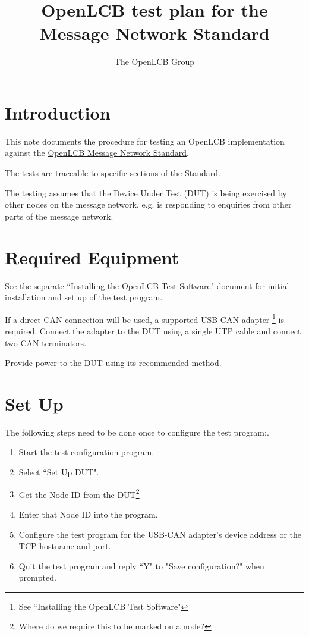 \documentclass[11pt]{article}
\title{OpenLCB test plan for the Message Network Standard}
\author{The OpenLCB Group}
\begin{document}
\maketitle


\section{Introduction}

This note documents the procedure for testing an OpenLCB implementation against the
\href{https://nbviewer.org/github/openlcb/documents/blob/master/standards/MessageNetworkS.pdf}
    {OpenLCB Message Network Standard}.

The tests are traceable to specific sections of the Standard.

The testing assumes that the Device Under Test (DUT) is being exercised by other
nodes on the message network, 
e.g. is responding to enquiries from other parts of the message network.

\section{Required Equipment}

See the separate ``Installing the OpenLCB Test Software" document for initial installation 
and set up of the test program.

If a direct CAN connection will be used,
a supported USB-CAN adapter
    \footnote{See ``Installing the OpenLCB Test Software"}
is required. 
Connect the adapter to the DUT using a single UTP cable and connect two CAN terminators.

Provide power to the DUT using its recommended method.

\section{Set Up}
The following steps need to be done once to configure the test program:.
\begin{enumerate}
\item Start the test configuration program. 
\item Select ``Set Up DUT".
\item Get the Node ID from the DUT\footnote{Where do we require this to be marked on a node?} 
\item Enter that Node ID into the program.
\item Configure the test program for the USB-CAN adapter's device address
        or the TCP hostname and port.
\item Quit the test program and reply ``Y" to "Save configuration?" when prompted.
\end{enumerate}
\end{document}

